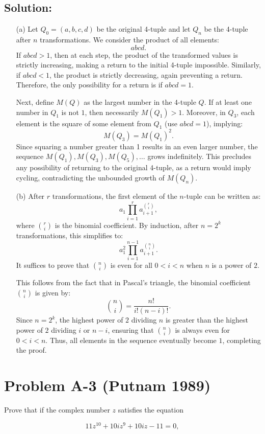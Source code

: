 \documentclass[11pt, a4paper, oneside]{article}
\newcommand{\problem}[1][]{\section{#1} \hfill \par}
\newcommand{\solution}[1][]{\subsection*{#1}\hfill \par}
\theoremstyle{remark}
\theoremstyle{lemma}
\begin{document}
\solution[Solution:]
\begin{enumerate}
    \item[(a)] Let \( Q_0 = (a, b, c, d) \) be the original 4-tuple and let \( Q_n \) be the 4-tuple after \( n \) transformations. We consider the product of all elements:
    \[
    abcd.
    \]
    If \( abcd > 1 \), then at each step, the product of the transformed values is strictly increasing, making a return to the initial 4-tuple impossible. Similarly, if \( abcd < 1 \), the product is strictly decreasing, again preventing a return. Therefore, the only possibility for a return is if \( abcd = 1 \).

    Next, define \( M(Q) \) as the largest number in the 4-tuple \( Q \). If at least one number in \( Q_1 \) is not \( 1 \), then necessarily \( M(Q_1) > 1 \). Moreover, in \( Q_3 \), each element is the square of some element from \( Q_1 \) (use $abcd=1$), implying:
    \[
    M(Q_3) = M(Q_1)^2.
    \]
    Since squaring a number greater than 1 results in an even larger number, the sequence \( M(Q_1), M(Q_3), M(Q_5), \dots \) grows indefinitely. This precludes any possibility of returning to the original 4-tuple, as a return would imply cycling, contradicting the unbounded growth of \( M(Q_n) \).

    \item[(b)] After \( r \) transformations, the first element of the \( n \)-tuple can be written as:
    \[
    a_1 \prod_{i=1}^{r} a_{i+1}^{\binom{r}{i}},
    \]
    where \( \binom{r}{i} \) is the binomial coefficient. By induction, after \( n = 2^k \) transformations, this simplifies to:
    \[
    a_1^2 \prod_{i=1}^{n-1} a_{i+1}^{\binom{n}{i}}.
    \]
    It suffices to prove that \( \binom{n}{i} \) is even for all \( 0 < i < n \) when \( n \) is a power of \( 2 \).  

    This follows from the fact that in Pascal's triangle, the binomial coefficient \( \binom{n}{i} \) is given by:
    \[
    \binom{n}{i} = \frac{n!}{i!(n-i)!}.
    \]
    Since \( n = 2^k \), the highest power of \( 2 \) dividing \( n \) is greater than the highest power of \( 2 \) dividing \( i \) or \( n-i \), ensuring that \( \binom{n}{i} \) is always even for \( 0 < i < n \). Thus, all elements in the sequence eventually become \( 1 \), completing the proof.
\end{enumerate}
    
\problem[Problem A-3 (Putnam 1989)]
Prove that if the complex number \( z \) satisfies the equation

\[
11z^{10} + 10i z^9 + 10i z -11 = 0,
\]
\end{document}
